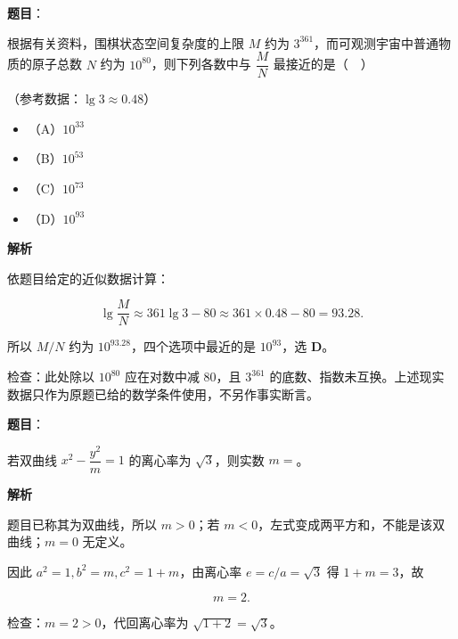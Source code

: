 \begin{answer}

\textbf{题目}：

根据有关资料，围棋状态空间复杂度的上限 $M$ 约为 $3^{361}$，而可观测宇宙中普通物质的原子总数 $N$ 约为 $10^{80}$，则下列各数中与 $\dfrac MN$ 最接近的是（　）

（参考数据：$\lg3\approx0.48$）

\begin{itemize}
\item （A）$10^{33}$
\item （B）$10^{53}$
\item （C）$10^{73}$
\item （D）$10^{93}$
\end{itemize}

\textbf{解析}

依题目给定的近似数据计算：

\nopagebreak[4]
\[\lg\frac MN\approx361\lg3-80\approx361\times0.48-80=93.28.\]

所以 $M/N$ 约为 $10^{93.28}$，四个选项中最近的是 $10^{93}$，选 \textbf{D}。

检查：此处除以 $10^{80}$ 应在对数中减 $80$，且 $3^{361}$ 的底数、指数未互换。上述现实数据只作为原题已给的数学条件使用，不另作事实断言。


\end{answer}
\begin{answer}

\textbf{题目}：

若双曲线 $x^2-\dfrac{y^2}{m}=1$ 的离心率为 $\sqrt3$，则实数 $m=$\gkblank{}。

\textbf{解析}

题目已称其为双曲线，所以 $m>0$；若 $m<0$，左式变成两平方和，不能是该双曲线；$m=0$ 无定义。

因此 $a^2=1,b^2=m,c^2=1+m$，由离心率 $e=c/a=\sqrt3$ 得 $1+m=3$，故

\nopagebreak[4]
\[\boxed{m=2}.\]

检查：$m=2>0$，代回离心率为 $\sqrt{1+2}=\sqrt3$。


\end{answer}
